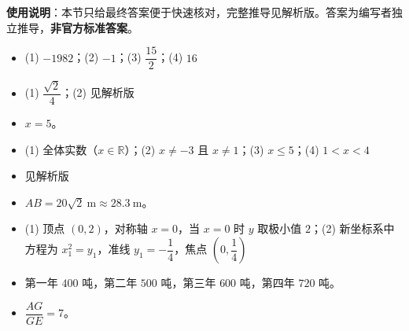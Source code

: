 
\begin{gknotice}
\textbf{使用说明}：本节只给最终答案便于快速核对，完整推导见解析版。答案为编写者独立推导，\textbf{非官方标准答案}。
\end{gknotice}

\begin{itemize}[leftmargin=2.6em]
  \item[\textbf{1.}] (1) $-1982$；(2) $-1$；(3) $\dfrac{15}{2}$；(4) $16$
  \item[\textbf{2.}] (1) $\dfrac{\sqrt2}{4}$；(2) 见解析版
  \item[\textbf{3.}] $x=5$。
  \item[\textbf{4.}] (1) 全体实数（$x\in\mathbb R$）；(2) $x\ne-3$ 且 $x\ne1$；(3) $x\le5$；(4) $1<x<4$
  \item[\textbf{5.}] 见解析版
  \item[\textbf{6.}] $AB=20\sqrt2\ \mathrm m\approx28.3\ \mathrm m$。
  \item[\textbf{7.}] (1) 顶点 $(0,2)$，对称轴 $x=0$，当 $x=0$ 时 $y$ 取极小值 $2$；(2) 新坐标系中方程为 $x_1^2=y_1$，准线 $y_1=-\dfrac14$，焦点 $\left(0,\dfrac14\right)$
  \item[\textbf{8.}] 第一年 $400$ 吨，第二年 $500$ 吨，第三年 $600$ 吨，第四年 $720$ 吨。
  \item[\textbf{9.}] $\dfrac{AG}{GE}=7$。
\end{itemize}
